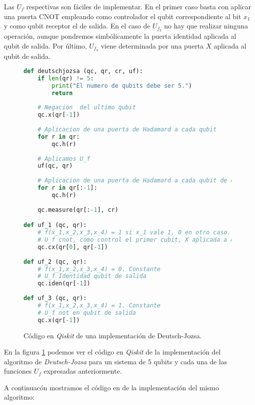 Las $U_f$ respectivas son fáciles de implementar. En el primer caso basta con aplicar una puerta CNOT empleando como controlador el qubit correspondiente al bit $x_1$ y como qubit receptor el de salida. En el caso de $U_{f_2}$ no hay que realizar ninguna operación, aunque pondremos simbólicamente la puerta identidad aplicada al qubit de salida. Por último, $U_{f_3}$ viene determinada por una puerta $X$ aplicada al qubit de salida.

\begin{figure}[!htb]
\begin{lstlisting}[language=Python]
def deutschjozsa (qc, qr, cr, uf):
    if len(qr) != 5:
        print("El numero de qubits debe ser 5.")
        return
    
    # Negacion  del ultimo qubit
    qc.x(qr[-1])
    
    # Aplicacion de una puerta de Hadamard a cada qubit
    for r in qr:
        qc.h(r)
        
    # Aplicamos U_f
    uf(qc, qr)
        
    # Aplicacion de una puerta de Hadamard a cada qubit de entrada
    for r in qr[:-1]:
        qc.h(r)
            
    qc.measure(qr[:-1], cr)

def uf_1 (qc, qr):
    # f(x_1,x_2,x_3,x_4) = 1 si x_1 vale 1, 0 en otro caso. Balanceada
    # U_f cnot, como control el primer cubit, X aplicada a qubit de salida
    qc.cx(qr[0], qr[-1])
    
def uf_2 (qc, qr):
    # f(x_1,x_2,x_3,x_4) = 0. Constante
    # U_f Identidad qubit de salida
    qc.iden(qr[-1])
    
def uf_3 (qc, qr):
    # f(x_1,x_2,x_3,x_4) = 1. Constante
    # U_f not en qubit de salida
    qc.x(qr[-1])
\end{lstlisting}
\caption{Código en \textit{Qiskit} de una implementación de Deutsch-Jozsa.}
\label{fig:code62}
\end{figure}

En la figura \ref{fig:code62} podemos ver el código en \textit{Qiskit} de la implementación del algoritmo de \textit{Deutsch-Jozsa} para un sistema de 5 qubits y cada una de las funciones $U_f$ expresadas anteriormente.

A continuacón mostramos el código en \qsh de la implementación del mismo algoritmo: 


